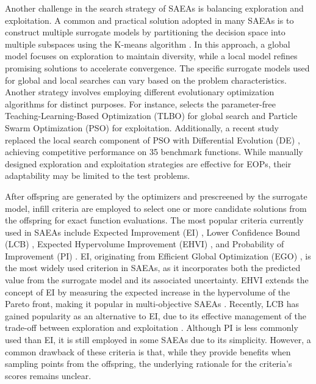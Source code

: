\documentclass[review]{elsarticle}
\begin{document}
Another challenge in the search strategy of SAEAs is balancing exploration and exploitation. A common and practical solution adopted in many SAEAs is to construct multiple surrogate models by partitioning the decision space into multiple subspaces using the K-means algorithm \cite{lv2023multi, yu2025surrogate}. In this approach, a global model focuses on exploration to maintain diversity, while a local model refines promising solutions to accelerate convergence. The specific surrogate models used for global and local searches can vary based on the problem characteristics. Another strategy involves employing different evolutionary optimization algorithms for distinct purposes. For instance, \cite{li2020surrogate} selects the parameter-free Teaching-Learning-Based Optimization (TLBO) for global search and Particle Swarm Optimization (PSO) for exploitation. Additionally, a recent study replaced the local search component of PSO with Differential Evolution (DE) \cite{lin2024surrogate}, achieving competitive performance on 35 benchmark functions. While manually designed exploration and exploitation strategies are effective for EOPs, their adaptability may be limited to the test problems.

After offspring are generated by the optimizers and prescreened by the surrogate model, infill criteria are employed to select one or more candidate solutions from the offspring for exact function evaluations. The most popular criteria currently used in SAEAs include Expected Improvement (EI) \cite{mockus1994application}, Lower Confidence Bound (LCB) \cite{cox1992statistical}, Expected Hypervolume Improvement (EHVI) \cite{daulton2020differentiable}, and Probability of Improvement (PI) \cite{viana2010surrogate}. EI, originating from Efficient Global Optimization (EGO) \cite{jones1998efficient}, is the most widely used criterion in SAEAs, as it incorporates both the predicted value from the surrogate model and its associated uncertainty. EHVI extends the concept of EI by measuring the expected increase in the hypervolume of the Pareto front, making it popular in multi-objective SAEAs \cite{pang2022expensive}. Recently, LCB has gained popularity as an alternative to EI, due to its effective management of the trade-off between exploration and exploitation \cite{li2023elite}. Although PI is less commonly used than EI, it is still employed in some SAEAs due to its simplicity. However, a common drawback of these criteria is that, while they provide benefits when sampling points from the offspring, the underlying rationale for the criteria's scores remains unclear.
\end{document}
